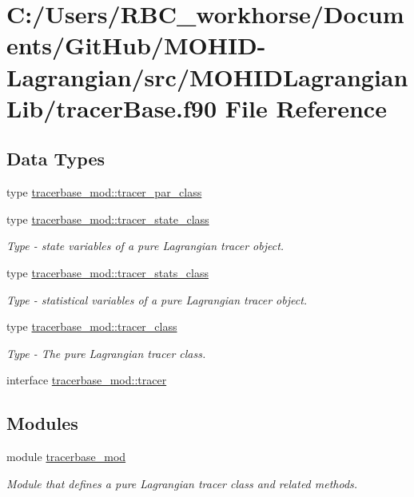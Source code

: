 \hypertarget{tracer_base_8f90}{}\section{C\+:/\+Users/\+R\+B\+C\+\_\+workhorse/\+Documents/\+Git\+Hub/\+M\+O\+H\+I\+D-\/\+Lagrangian/src/\+M\+O\+H\+I\+D\+Lagrangian\+Lib/tracer\+Base.f90 File Reference}
\label{tracer_base_8f90}
\subsection*{Data Types}
\begin{DoxyCompactItemize}
\item 
type \mbox{\hyperlink{structtracerbase__mod_1_1tracer__par__class}{tracerbase\+\_\+mod\+::tracer\+\_\+par\+\_\+class}}
\item 
type \mbox{\hyperlink{structtracerbase__mod_1_1tracer__state__class}{tracerbase\+\_\+mod\+::tracer\+\_\+state\+\_\+class}}
\begin{DoxyCompactList}\small\item\em Type -\/ state variables of a pure Lagrangian tracer object. \end{DoxyCompactList}\item 
type \mbox{\hyperlink{structtracerbase__mod_1_1tracer__stats__class}{tracerbase\+\_\+mod\+::tracer\+\_\+stats\+\_\+class}}
\begin{DoxyCompactList}\small\item\em Type -\/ statistical variables of a pure Lagrangian tracer object. \end{DoxyCompactList}\item 
type \mbox{\hyperlink{structtracerbase__mod_1_1tracer__class}{tracerbase\+\_\+mod\+::tracer\+\_\+class}}
\begin{DoxyCompactList}\small\item\em Type -\/ The pure Lagrangian tracer class. \end{DoxyCompactList}\item 
interface \mbox{\hyperlink{interfacetracerbase__mod_1_1tracer}{tracerbase\+\_\+mod\+::tracer}}
\end{DoxyCompactItemize}
\subsection*{Modules}
\begin{DoxyCompactItemize}
\item 
module \mbox{\hyperlink{namespacetracerbase__mod}{tracerbase\+\_\+mod}}
\begin{DoxyCompactList}\small\item\em Module that defines a pure Lagrangian tracer class and related methods. \end{DoxyCompactList}\end{DoxyCompactItemize}
